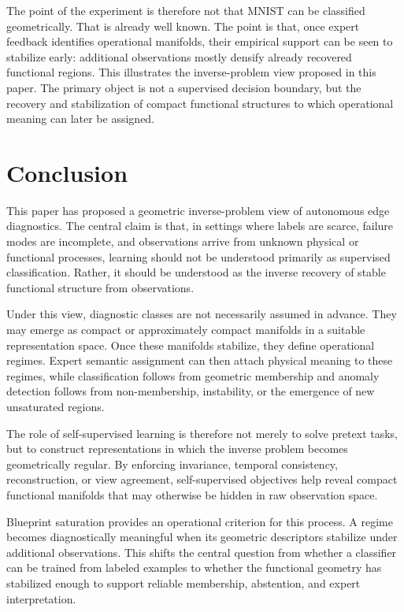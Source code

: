 \documentclass[11pt,a4paper]{article}
\begin{document}
The point of the experiment is therefore not that MNIST can be classified geometrically. That is already well known. The point is that, once expert feedback identifies operational manifolds, their empirical support can be seen to stabilize early: additional observations mostly densify already recovered functional regions. This illustrates the inverse-problem view proposed in this paper. The primary object is not a supervised decision boundary, but the recovery and stabilization of compact functional structures to which operational meaning can later be assigned.

\section{Conclusion}

This paper has proposed a geometric inverse-problem view of autonomous edge diagnostics. The central claim is that, in settings where labels are scarce, failure modes are incomplete, and observations arrive from unknown physical or functional processes, learning should not be understood primarily as supervised classification. Rather, it should be understood as the inverse recovery of stable functional structure from observations.

Under this view, diagnostic classes are not necessarily assumed in advance. They may emerge as compact or approximately compact manifolds in a suitable representation space. Once these manifolds stabilize, they define operational regimes. Expert semantic assignment can then attach physical meaning to these regimes, while classification follows from geometric membership and anomaly detection follows from non-membership, instability, or the emergence of new unsaturated regions.

The role of self-supervised learning is therefore not merely to solve pretext tasks, but to construct representations in which the inverse problem becomes geometrically regular. By enforcing invariance, temporal consistency, reconstruction, or view agreement, self-supervised objectives help reveal compact functional manifolds that may otherwise be hidden in raw observation space.

Blueprint saturation provides an operational criterion for this process. A regime becomes diagnostically meaningful when its geometric descriptors stabilize under additional observations. This shifts the central question from whether a classifier can be trained from labeled examples to whether the functional geometry has stabilized enough to support reliable membership, abstention, and expert interpretation.
\end{document}
